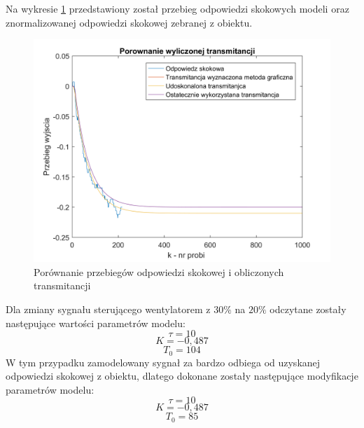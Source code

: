 \documentclass[12pt, a4paper]{article}
\begin{document}
Na wykresie \ref{fig:transmi_wg} przedstawiony został przebieg odpowiedzi skokowych modeli oraz znormalizowanej odpowiedzi skokowej zebranej z obiektu.
\begin{figure}[H]
	\centering
	\includegraphics[width=0.9\linewidth]{transmi_wg}
	\caption  {Porównanie przebiegów odpowiedzi skokowej i obliczonych transmitancji}
	\label{fig:transmi_wg}
\end{figure}
Dla zmiany sygnału sterującego wentylatorem z $30\%$ na $20\%$ odczytane zostały następujące wartości parametrów modelu:
\[\tau=10\]
\[K=-0,487\]
\[T_{0}=104\]
W tym przypadku zamodelowany sygnał za bardzo odbiega od uzyskanej odpowiedzi skokowej z obiektu, dlatego dokonane zostały następujące modyfikacje parametrów modelu:
\[\tau=10\]
\[K=-0,487\]
\[T_{0}=85\]
\end{document}
